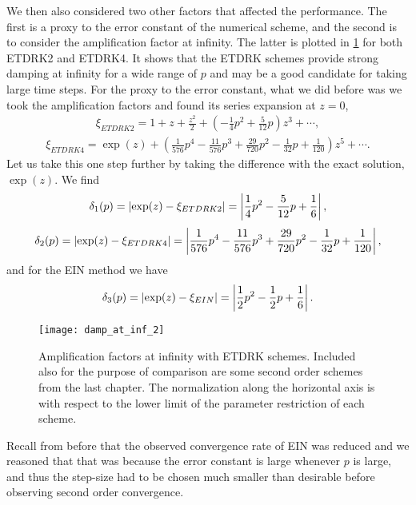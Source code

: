 We then also considered two other factors that affected the performance. The first is a proxy to the error constant of the numerical scheme, and the second is to consider the amplification factor at infinity. The latter is plotted in \cref{fig:damp fac at inf etd} for both ETDRK2 and ETDRK4. It shows that the ETDRK schemes provide strong damping at infinity for a wide range of $p$ and may be a good candidate for taking large time steps. For the proxy to the error constant, what we did before was we took the amplification factors and found its series expansion at $z=0$,
\begin{align}
        \xi_{ETDRK2} = 1+ z + \frac{z^2}{2} + \left(-\frac{1}{4}p^2 + \frac{5}{12}p \right) z^3 + \cdots ,
\end{align}
\begin{align}
        \xi_{ETDRK4} = \exp(z) + \left( 
\frac{1}{576}p^4 
- \frac{11}{576}p^3
+ \frac{29}{720}p^2
- \frac{1}{32}p
+ \frac{1}{120} 
\right) z^5 + \cdots .
\end{align}
Let us take this one step further by taking the difference with the exact solution, $\exp(z)$. We find 
\begin{align}
        \delta_1(p) = \left|\exp(z) - \xi_{ETDRK2}\right| 
= \left|\frac{1}{4}p^2 - \frac{5}{12}p + \frac{1}{6}\right|,
\end{align}
\begin{align}
        \delta_2(p) = \left|\exp(z) - \xi_{ETDRK4}\right| 
= \left|\frac{1}{576}p^4 
- \frac{11}{576}p^3
+ \frac{29}{720}p^2
- \frac{1}{32}p
+ \frac{1}{120} \right|,
\end{align}
and for the EIN method we have 
\begin{align}
\delta_3(p) = \left|\exp(z) - \xi_{EIN}\right| 
= \left|\frac{1}{2} p^2 - \frac{1}{2}p + \frac{1}{6}\right|.
\end{align}

\begin{figure}[htb!]
        \centering
\texttt{[image: damp\_at\_inf\_2]}
\caption[Amplification factors at infinity with ETDRK schemes.]{Amplification factors at infinity with ETDRK schemes. Included also for the purpose of comparison are some second order schemes from the last chapter. The normalization along the horizontal axis is with respect to the lower limit of the parameter restriction of each scheme.}
\label{fig:damp fac at inf etd}
\end{figure}

Recall from before that the observed convergence rate of EIN was reduced and we reasoned that that was because the error constant is large whenever $p$ is large, and thus the step-size had to be chosen much smaller than desirable before observing second order convergence.

